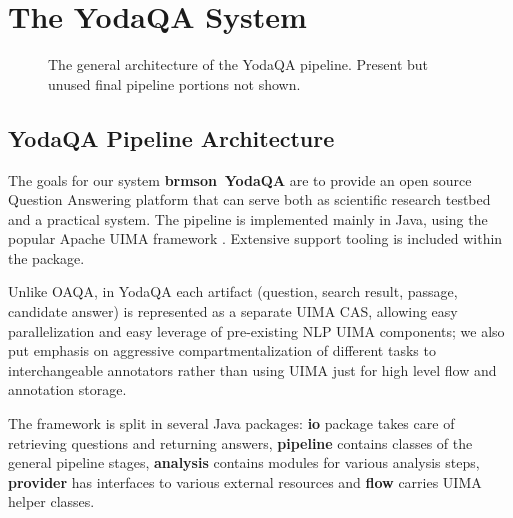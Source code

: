 \chapter{The YodaQA System}
\label{ch:work}

\begin{figure}[hb]
\begin{center}
\caption{The general architecture of the YodaQA pipeline.  Present but unused final pipeline portions not shown.}
\label{fig:arch}
\end{center}
\end{figure}%

\section{YodaQA Pipeline Architecture}
\label{sec:yodaqaarch}

The goals for our system \textbf{brmson{\footnotesize\,\texttrademark{}} YodaQA} are to provide an open source
Question Answering platform that can serve both as scientific research
testbed and a practical system. The pipeline is implemented mainly in Java,
using the popular Apache UIMA framework \citep{UIMA}.  Extensive support
tooling is included within the package.

Unlike OAQA, in YodaQA each artifact (question, search result, passage,
candidate answer) is represented as a separate UIMA CAS, allowing easy
parallelization and easy leverage of pre-existing NLP UIMA components;
we also put emphasis on aggressive compartmentalization
of different tasks to interchangeable annotators rather than using
UIMA just for high level flow and annotation storage.

The framework is split in several Java packages: \textbf{io} package takes care
of retrieving questions and returning answers, \textbf{pipeline} contains
classes of the general pipeline stages, \textbf{analysis} contains
modules for various analysis steps, \textbf{provider} has interfaces
to various external resources and \textbf{flow} carries UIMA helper classes.

